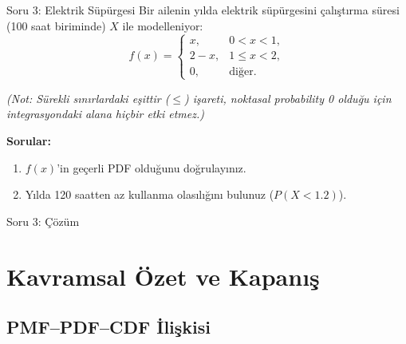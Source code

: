 ﻿\documentclass[light]{lutbeamer}
\begin{document}
\begin{frame}{Soru 3: Elektrik Süpürgesi}
    Bir ailenin yılda elektrik süpürgesini çalıştırma süresi (100 saat biriminde) $X$ ile modelleniyor:
    \[
    f(x) =
    \begin{cases}
      x, & 0 < x < 1,\\
      2 - x, & 1 \le x < 2,\\
      0, & \text{diğer}.
    \end{cases}
    \]
    \begin{center}
      \scriptsize \textit{(Not: Sürekli sınırlardaki eşittir ($\le$) işareti, noktasal probability 0 olduğu için integrasyondaki alana hiçbir etki etmez.)}
    \end{center}

    \textbf{Sorular:}
    \begin{enumerate}
      \item[(a)] $f(x)$'in geçerli PDF olduğunu doğrulayınız.
      \item[(b)] Yılda 120 saatten az kullanma olasılığını bulunuz ($P(X < 1.2)$).
    \end{enumerate}
\end{frame}

\begin{frame}{Soru 3: Çözüm}
\end{frame}



\section{Kavramsal Özet ve Kapanış}
\subsection{PMF--PDF--CDF İlişkisi}
\end{document}

